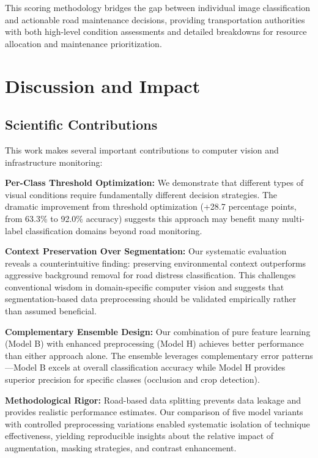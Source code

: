 \documentclass[12pt]{article}
\begin{document}
This scoring methodology bridges the gap between individual image classification and actionable road maintenance decisions, providing transportation authorities with both high-level condition assessments and detailed breakdowns for resource allocation and maintenance prioritization.


\section{Discussion and Impact}

\subsection{Scientific Contributions}

This work makes several important contributions to computer vision and infrastructure monitoring:

\textbf{Per-Class Threshold Optimization:} We demonstrate that different types of visual conditions require fundamentally different decision strategies. The dramatic improvement from threshold optimization (+28.7 percentage points, from 63.3\% to 92.0\% accuracy) suggests this approach may benefit many multi-label classification domains beyond road monitoring.

\textbf{Context Preservation Over Segmentation:} Our systematic evaluation reveals a counterintuitive finding: preserving environmental context outperforms aggressive background removal for road distress classification. This challenges conventional wisdom in domain-specific computer vision and suggests that segmentation-based data preprocessing should be validated empirically rather than assumed beneficial.

\textbf{Complementary Ensemble Design:} Our combination of pure feature learning (Model B) with enhanced preprocessing (Model H) achieves better performance than either approach alone. The ensemble leverages complementary error patterns—Model B excels at overall classification accuracy while Model H provides superior precision for specific classes (occlusion and crop detection).

\textbf{Methodological Rigor:} Road-based data splitting prevents data leakage and provides realistic performance estimates. Our comparison of five model variants with controlled preprocessing variations enabled systematic isolation of technique effectiveness, yielding reproducible insights about the relative impact of augmentation, masking strategies, and contrast enhancement.
\end{document}
